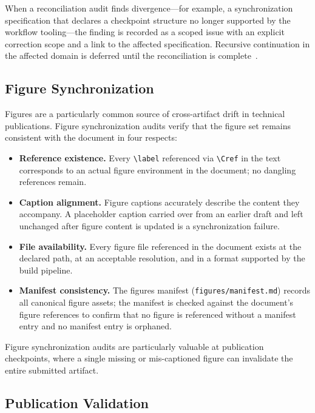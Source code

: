 When a reconciliation audit finds divergence---for example, a synchronization specification that declares a checkpoint structure no longer supported by the workflow tooling---the finding is recorded as a scoped issue with an explicit correction scope and a link to the affected specification. Recursive continuation in the affected domain is deferred until the reconciliation is complete~\cite{Beer1972BrainFirm}.

\subsection{Figure Synchronization}

Figures are a particularly common source of cross-artifact drift in technical publications. Figure synchronization audits verify that the figure set remains consistent with the document in four respects:

\begin{itemize}
  \item \textbf{Reference existence.} Every \texttt{\textbackslash{}label} referenced via \texttt{\textbackslash{}Cref} in the text corresponds to an actual figure environment in the document; no dangling references remain.
  \item \textbf{Caption alignment.} Figure captions accurately describe the content they accompany. A placeholder caption carried over from an earlier draft and left unchanged after figure content is updated is a synchronization failure.
  \item \textbf{File availability.} Every figure file referenced in the document exists at the declared path, at an acceptable resolution, and in a format supported by the build pipeline.
  \item \textbf{Manifest consistency.} The figures manifest (\texttt{figures/manifest.md}) records all canonical figure assets; the manifest is checked against the document's figure references to confirm that no figure is referenced without a manifest entry and no manifest entry is orphaned.
\end{itemize}

Figure synchronization audits are particularly valuable at publication checkpoints, where a single missing or mis-captioned figure can invalidate the entire submitted artifact.

\subsection{Publication Validation}


